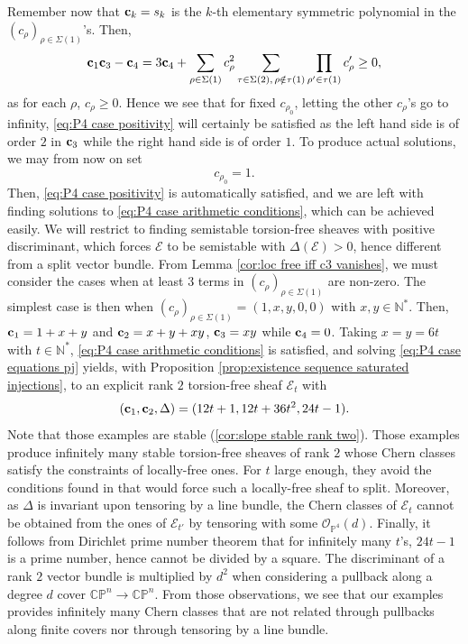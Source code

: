 \documentclass[a4paper,10pt]{amsart}
\theoremstyle{plain}{
    \newtheorem{theorem}{Theorem}[section]
    \newtheorem{lemma}[theorem]{Lemma}
    \newtheorem{corollary}[theorem]{Corollary}
    \newtheorem{proposition}[theorem]{Proposition}
    \newtheorem{conjecture}[theorem]{Conjecture}
}
\theoremstyle{definition}{
    \newtheorem{definition}[theorem]{Definition}
    \newtheorem{defn-thm}[theorem]{Definition-Theorem}
    \newtheorem{example}[theorem]{Example}
    \newtheorem{notation}[theorem]{Notation}
}
\theoremstyle{remark}{
    \newtheorem{remark}[theorem]{Remark}
    \newtheorem{problem}[theorem]{Problem}
    \newtheorem{question}[theorem]{Question}
}
\def\uc{{\bf c}}
\def\cE{\mathcal{E}}
\def\cO{\mathcal{O}}
\def\N{\mathbb{N}}
\def\P{\mathbb{P}}
\def\C{\mathbb{C}}
\begin{document}
Remember now that $\uc_k=s_k$ is the $k$-th elementary symmetric polynomial in the $(c_\rho)_{\rho\in\Sigma(1)}$'s. Then, 
$$
\uc_1\uc_3-\uc_4 = 3\uc_4+\sum_{\rho\in\Sigma(1)} c_\rho^2\sum_{\tau\in\Sigma(2),\,\rho\notin\tau(1)} \prod_{\rho'\in\tau(1)}c_\rho'\geq 0,
$$
as for each $\rho$, $c_\rho\geq 0$. Hence we see that for fixed $c_{\rho_0}$, letting the other $c_\rho$'s go to infinity, \eqref{eq:P4 case positivity} will certainly be satisfied as the left hand side is of order $2$ in $\uc_3$ while the right hand side is of order $1$. To produce actual solutions, we may from now on set
$$
c_{\rho_0}=1.
$$
Then, \eqref{eq:P4 case positivity} is automatically satisfied, and we are left with finding solutions to \eqref{eq:P4 case arithmetic conditions}, which can be achieved easily. We will restrict to finding semistable torsion-free sheaves with positive discriminant, which forces $\cE$ to be semistable with $\Delta(\cE)>0$, hence different from a split vector bundle. From Lemma \ref{cor:loc free iff c3 vanishes}, we must consider the cases when at least $3$ terms in $(c_\rho)_{\rho\in\Sigma(1)}$ are non-zero. The simplest case is then when $(c_\rho)_{\rho\in\Sigma(1)}=(1,x,y,0,0)$ with $x,y\in\N^*$. Then, $\uc_1=1+x+y$ and $\uc_2=x+y+xy$, $\uc_3=xy$ while $\uc_4=0$. Taking $x=y=6t$ with $t\in\N^*$, \eqref{eq:P4 case arithmetic conditions} is satisfied, and solving \eqref{eq:P4 case equations pj} yields, with Proposition \ref{prop:existence sequence saturated injections}, to an explicit rank $2$ torsion-free sheaf $\cE_t$ with
$$
(\uc_1,\uc_2,\Delta)=(12t+1,12t+36t^2,24t-1).
$$
Note that those examples are stable (\ref{cor:slope stable rank two}).  Those examples produce infinitely many stable torsion-free sheaves of rank $2$ whose Chern classes satisfy the constraints of locally-free ones. For $t$ large enough, they avoid the conditions found in \cite{HoSch} that would force such a locally-free sheaf to split. Moreover, as $\Delta$ is invariant upon tensoring by a line bundle, the Chern classes of $\cE_t$ cannot be obtained from the ones of $\cE_{t'}$ by tensoring with some $\cO_{\P^4}(d)$. Finally, it follows from  Dirichlet prime number theorem that for infinitely many $t$'s, $24t-1$ is a prime number, hence cannot be divided by a square. The discriminant of a rank $2$ vector bundle is multiplied by $d^2$ when considering a pullback along a degree $d$ cover $\C\P^n\to\C\P^n$. From those observations, we see that our examples provides infinitely many Chern classes that are not related through pullbacks along finite covers nor through tensoring by a line bundle.
\end{document}
